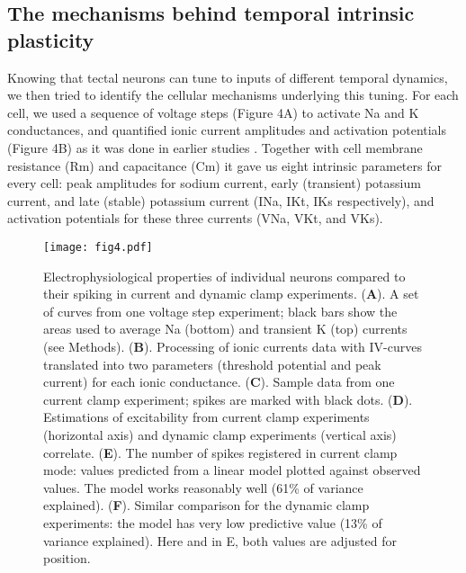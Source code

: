 \documentclass{article}
\begin{document}
\subsection*{The mechanisms behind temporal intrinsic plasticity}

Knowing that tectal neurons can tune to inputs of different temporal dynamics, we then tried to identify the cellular mechanisms underlying this tuning. For each cell, we used a sequence of voltage steps (Figure 4A) to activate Na and K conductances, and quantified ionic current amplitudes and activation potentials (Figure 4B) as it was done in earlier studies \citep{ciarleglio2015}. Together with cell membrane resistance (Rm) and capacitance (Cm) it gave us eight intrinsic parameters for every cell: peak amplitudes for sodium current, early (transient) potassium current, and late (stable) potassium current (INa, IKt, IKs respectively), and activation potentials for these three currents (VNa, VKt, and VKs). 

\begin{figure}[!t]
\centering
\texttt{[image: fig4.pdf]}
\caption{Electrophysiological properties of individual neurons compared to their spiking in current and dynamic clamp experiments. (\textbf{A}). A set of curves from one voltage step experiment; black bars show the areas used to average Na (bottom) and transient K (top) currents (see Methods). (\textbf{B}). Processing of ionic currents data with IV-curves translated into two parameters (threshold potential and peak current) for each ionic conductance. (\textbf{C}). Sample data from one current clamp experiment; spikes are marked with black dots. (\textbf{D}). Estimations of excitability from current clamp experiments (horizontal axis) and dynamic clamp experiments (vertical axis) correlate. (\textbf{E}). The number of spikes registered in current clamp mode: values predicted from a linear model plotted against observed values. The model works reasonably well (61\% of variance explained). (\textbf{F}). Similar comparison for the dynamic clamp experiments: the model has very low predictive value (13\% of variance explained). Here and in E, both values are adjusted for position.}
\end{figure}
\end{document}
